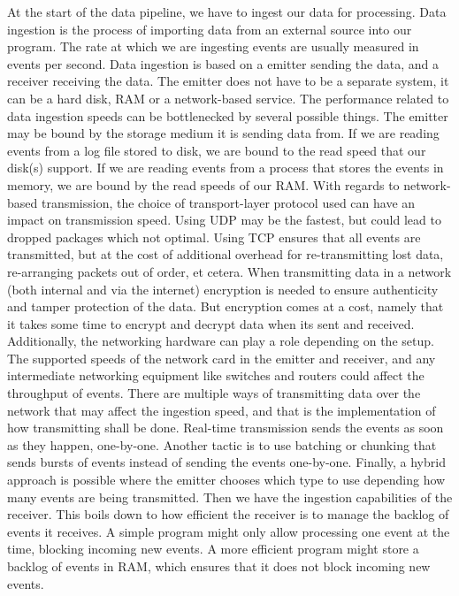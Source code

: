 At the start of the data pipeline, we have to ingest our data for processing. Data ingestion is the process of importing data from an external source into our program. The rate at which we are ingesting events are usually measured in events per second.
Data ingestion is based on a emitter sending the data, and a receiver receiving the data. The emitter does not have to be a separate system, it can be a hard disk, RAM or a network-based service. 
The performance related to data ingestion speeds can be bottlenecked by several possible things. The emitter may be bound by the storage medium it is sending data from. If we are reading events from a log file stored to disk, we are bound to the read speed that our disk(s) support. If we are reading events from a process that stores the events in memory, we are bound by the read speeds of our RAM.
With regards to network-based transmission, the choice of transport-layer protocol used can have an impact on transmission speed. Using UDP may be the fastest, but could lead to dropped packages which not optimal. Using TCP ensures that all events are transmitted, but at the cost of additional overhead for re-transmitting lost data, re-arranging packets out of order, et cetera. When transmitting data in a network (both internal and via the internet) encryption is needed to ensure authenticity and tamper protection of the data. But encryption comes at a cost, namely that it takes some time to encrypt and decrypt data when its sent and received.
Additionally, the networking hardware can play a role depending on the setup. The supported speeds of the network card in the emitter and receiver, and any intermediate networking equipment like switches and routers could affect the throughput of events.
There are multiple ways of transmitting data over the network that may affect the ingestion speed, and that is the implementation of how transmitting shall be done. Real-time transmission sends the events as soon as they happen, one-by-one. Another tactic is to use batching or chunking that sends bursts of events instead of sending the events one-by-one. Finally, a hybrid approach is possible where the emitter chooses which type to use depending how many events are being transmitted.
Then we have the ingestion capabilities of the receiver. This boils down to how efficient the receiver is to manage the backlog of events it receives. A simple program might only allow processing one event at the time, blocking incoming new events. A more efficient program might store a backlog of events in RAM, which ensures that it does not block incoming new events.

